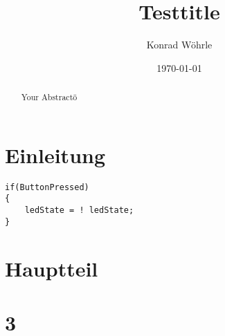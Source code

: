 \documentclass{article}
\title{Testtitle}
\author{Konrad Wöhrle}
\date{\today}
\begin{document}
\maketitle

\section{Einleitung}

\begin{verbatim}
if(ButtonPressed)
{
    ledState = ! ledState;
}
\end{verbatim}

\section{Hauptteil}

\section{3}

\begin{abstract}
Your Abstractö
\end{abstract}
\end{document}
